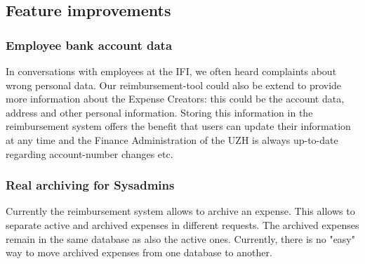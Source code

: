 \subsection{Feature improvements}
\subsubsection{Employee bank account data}In conversations with employees at the IFI, we often heard complaints about wrong personal data. Our reimbursement-tool could also be extend to provide more information about the Expense Creators: this could be the account data, address and other personal information. Storing this information in the reimbursement system offers the benefit that users can update their information at any time and the Finance Administration of the UZH is always up-to-date regarding account-number changes etc.

\subsubsection{Real archiving for Sysadmins} 
Currently the reimbursement system allows to archive an expense. This allows to separate active and archived expenses in different requests. The archived expenses remain in the same database as also the active ones. Currently, there is no "easy" way to move archived expenses from one database to another.
